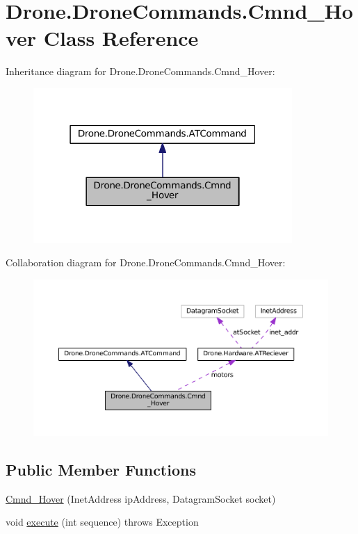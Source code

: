 \hypertarget{class_drone_1_1_drone_commands_1_1_cmnd___hover}{}\section{Drone.\+Drone\+Commands.\+Cmnd\+\_\+\+Hover Class Reference}
\label{class_drone_1_1_drone_commands_1_1_cmnd___hover}


Inheritance diagram for Drone.\+Drone\+Commands.\+Cmnd\+\_\+\+Hover\+:\nopagebreak
\begin{figure}[H]
\begin{center}
\leavevmode
\includegraphics[width=279pt]{class_drone_1_1_drone_commands_1_1_cmnd___hover__inherit__graph}
\end{center}
\end{figure}


Collaboration diagram for Drone.\+Drone\+Commands.\+Cmnd\+\_\+\+Hover\+:\nopagebreak
\begin{figure}[H]
\begin{center}
\leavevmode
\includegraphics[width=350pt]{class_drone_1_1_drone_commands_1_1_cmnd___hover__coll__graph}
\end{center}
\end{figure}
\subsection*{Public Member Functions}
\begin{DoxyCompactItemize}
\item 
\hyperlink{class_drone_1_1_drone_commands_1_1_cmnd___hover_a6bc2451caafbd0c40abad53a1134b487}{Cmnd\+\_\+\+Hover} (Inet\+Address ip\+Address, Datagram\+Socket socket)
\item 
void \hyperlink{class_drone_1_1_drone_commands_1_1_cmnd___hover_a420a0efbfd9a7872eac0cf8174b993bd}{execute} (int sequence)  throws Exception  	
\end{DoxyCompactItemize}
